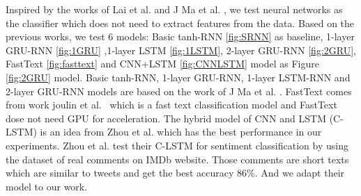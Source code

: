  Inspired by the works of Lai et al. \cite{lai2015recurrent} and J Ma et al.  \cite{madetecting}, we test neural networks as the classifier which does not need to extract features from the data. Based on the previous works, we test 6 models: Basic tanh-RNN \ref{fig:SRNN} as baseline, 1-layer GRU-RNN \ref{fig:1GRU} ,1-layer LSTM \ref{fig:1LSTM}, 2-layer GRU-RNN \ref{fig:2GRU}, FastText \ref{fig:fasttext} and CNN+LSTM \ref{fig:CNNLSTM}  model  as Figure \ref{fig:2GRU} model. Basic tanh-RNN, 1-layer GRU-RNN, 1-layer LSTM-RNN and 2-layer GRU-RNN models are based on the work of J Ma et al. \cite{madetecting}. FastText comes from work  joulin et al.~\cite{joulin2016bag} which is a fast text classification model and FastText dose not need GPU for acceleration. The hybrid model of CNN and LSTM (C-LSTM) is an idea from Zhou et al. \cite{zhou2015c} which has the best performance in our experiments. Zhou et al. test their C-LSTM for sentiment classification by using the dataset of real comments on IMDb website. Those comments are short texts which are similar to tweets and get the best accuracy 86\%. And we adapt their model to our work.

